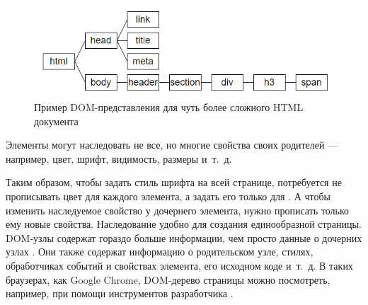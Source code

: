 \begin{figure}[h]
	\centering
	\captionsetup{justification=centering}
	\includegraphics[width=120mm]{img/simple-dom-2.png}
	\caption{Пример DOM-представления для чуть более сложного HTML документа}
	\label{fig:simple-dom-2}
\end{figure}

%
%
%
%

Элементы могут наследовать не все, но многие свойства своих родителей --- например, цвет, шрифт, видимость, размеры и~т.~д.

Таким образом, чтобы задать стиль шрифта на всей странице, потребуется не прописывать цвет для каждого элемента, а задать его только для .
А чтобы изменить наследуемое свойство у дочернего элемента, нужно прописать только ему новые свойства.
Наследование удобно для создания единообразной страницы.
DOM-узлы содержат гораздо больше информации, чем просто данные о дочерних узлах \cite{dom-element}.
Они также содержат информацию о родительском узле, стилях, обработчиках событий и свойствах элемента, его исходном  коде и~т.~д.
В таких браузерах, как Google Chrome, DOM-дерево страницы можно посмотреть, например, при помощи инструментов разработчика \cite{devtools}.


